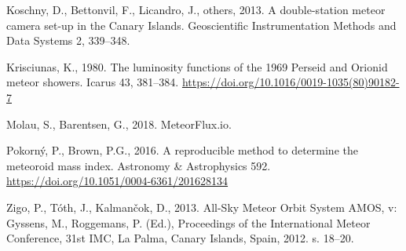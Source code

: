 \hypertarget{ref-koschny2013}{}
Koschny, D., Bettonvil, F., Licandro, J., others, 2013. A double-station
meteor camera set-up in the Canary Islands. Geoscientific
Instrumentation Methods and Data Systems 2, 339--348.

\hypertarget{ref-krisciunas1980}{}
Krisciunas, K., 1980. The luminosity functions of the 1969 Perseid and
Orionid meteor showers. Icarus 43, 381--384.
\url{https://doi.org/10.1016/0019-1035(80)90182-7}

\hypertarget{ref-meteorflux}{}
Molau, S., Barentsen, G., 2018. MeteorFlux.io.

\hypertarget{ref-pokorny-brown2016}{}
Pokorný, P., Brown, P.G., 2016. A reproducible method to determine the
meteoroid mass index. Astronomy \& Astrophysics 592.
\url{https://doi.org/10.1051/0004-6361/201628134}

\hypertarget{ref-zigo2013}{}
Zigo, P., Tóth, J., Kalmančok, D., 2013. All-Sky Meteor Orbit System
AMOS, v: Gyssens, M., Roggemans, P. (Ed.), Proceedings of the
International Meteor Conference, 31st IMC, La Palma, Canary Islands,
Spain, 2012. s. 18--20.
